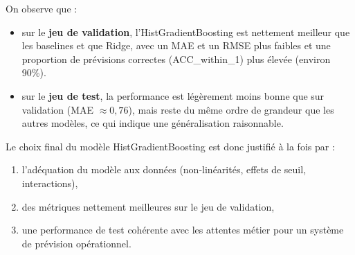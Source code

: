 \documentclass[11pt,a4paper]{article}
\begin{document}
On observe que :

\begin{itemize}
  \item sur le \textbf{jeu de validation}, l'HistGradientBoosting est nettement meilleur que les baselines et que Ridge, avec un MAE et un RMSE plus faibles et une proportion de prévisions correctes (ACC\_within\_1) plus élevée (environ 90\%).
  \item sur le \textbf{jeu de test}, la performance est légèrement moins bonne que sur validation (MAE $\approx 0{,}76$), mais reste du même ordre de grandeur que les autres modèles, ce qui indique une généralisation raisonnable.
\end{itemize}

Le choix final du modèle HistGradientBoosting est donc justifié à la fois par :

\begin{enumerate}
  \item l'adéquation du modèle aux données (non-linéarités, effets de seuil, interactions),
  \item des métriques nettement meilleures sur le jeu de validation,
  \item une performance de test cohérente avec les attentes métier pour un système de prévision opérationnel.
\end{enumerate}
\end{document}
